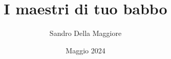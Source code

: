 \documentclass[a4paper,12pt,oneside,openany]{book}%
\begin{document}
	\author{Sandro Della Maggiore}
	\title{I maestri di tuo babbo}
	\date{Maggio 2024}
	\maketitle
	
	
	
\end{document}
